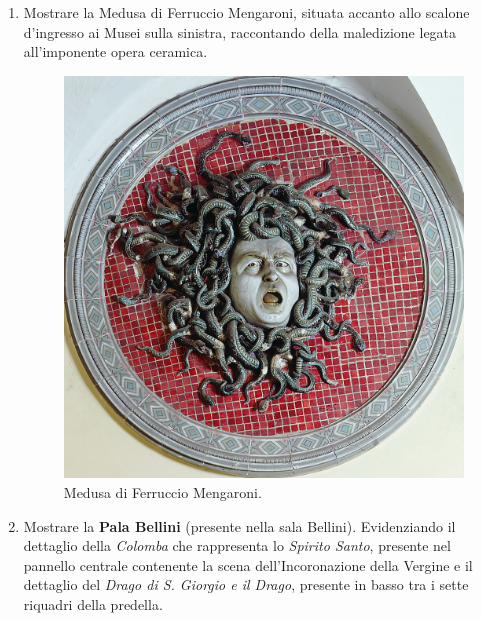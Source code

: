 \documentclass[12pt,a4paper]{article}
\begin{document}
	\begin{enumerate}
		
	\item 	Mostrare la Medusa di Ferruccio Mengaroni, situata accanto allo scalone d'ingresso ai Musei sulla sinistra, raccontando della maledizione legata all'imponente opera ceramica.
	\begin{figure}[h]
		\centering
		\includegraphics[]{Medusa.jpg}
		\caption{Medusa di Ferruccio Mengaroni.}
	\end{figure}
	
	\item Mostrare la \textbf{Pala Bellini} (presente nella sala Bellini). Evidenziando il dettaglio della \textit{Colomba} che rappresenta lo \textit{Spirito Santo}, presente nel pannello centrale contenente la scena dell'Incoronazione della Vergine e il dettaglio del \textit{Drago di S. Giorgio e il Drago}, presente in basso tra i sette riquadri della predella.
	

\end{enumerate}
\end{document}
